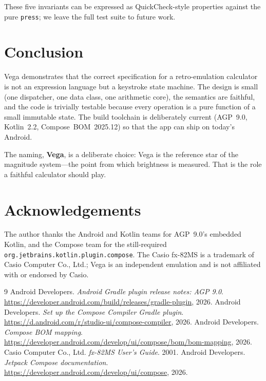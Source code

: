 \documentclass[11pt,a4paper]{article}
\begin{document}
These five invariants can be expressed as QuickCheck-style properties against the pure \texttt{press}; we leave the full test suite to future work.

\section{Conclusion}

Vega demonstrates that the correct specification for a retro-emulation calculator is not an expression language but a keystroke state machine. The design is small (one dispatcher, one data class, one arithmetic core), the semantics are faithful, and the code is trivially testable because every operation is a pure function of a small immutable state. The build toolchain is deliberately current (AGP~9.0, Kotlin~2.2, Compose~BOM~2025.12) so that the app can ship on today's Android.

The naming, \textbf{Vega}, is a deliberate choice: Vega is the reference star of the magnitude system---the point from which brightness is measured. That is the role a faithful calculator should play.

\section*{Acknowledgements}

The author thanks the Android and Kotlin teams for AGP~9.0's embedded Kotlin, and the Compose team for the still-required \texttt{org.jetbrains.kotlin.plugin.compose}. The Casio fx-82MS is a trademark of Casio Computer Co., Ltd.; Vega is an independent emulation and is not affiliated with or endorsed by Casio.

\begin{thebibliography}{9}
 Android Developers. \emph{Android Gradle plugin release notes: AGP 9.0}. \url{https://developer.android.com/build/releases/gradle-plugin}, 2026.
 Android Developers. \emph{Set up the Compose Compiler Gradle plugin}. \url{https://d.android.com/r/studio-ui/compose-compiler}, 2026.
 Android Developers. \emph{Compose BOM mapping}. \url{https://developer.android.com/develop/ui/compose/bom/bom-mapping}, 2026.
 Casio Computer Co., Ltd. \emph{fx-82MS User's Guide}. 2001.
 Android Developers. \emph{Jetpack Compose documentation}. \url{https://developer.android.com/develop/ui/compose}, 2026.
\end{thebibliography}
\end{document}

